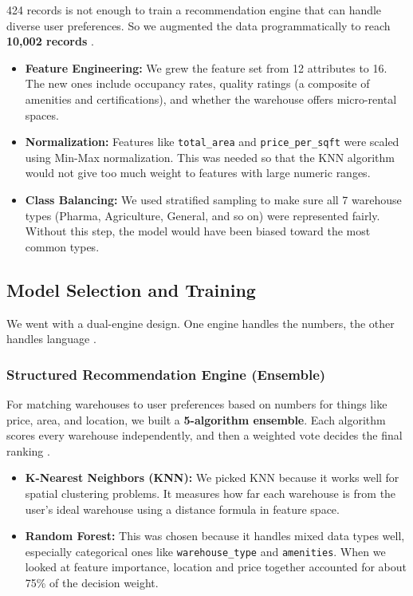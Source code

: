 \documentclass[pdflatex,sn-mathphys-num]{sn-jnl}
\theoremstyle{thmstyleone}
\theoremstyle{thmstyletwo}
\theoremstyle{thmstylethree}
\begin{document}
424 records is not enough to train a recommendation engine
that can handle diverse user preferences.
So we augmented the data programmatically to reach
\textbf{10,002 records} \cite{b10}.
\begin{itemize}
    \item \textbf{Feature Engineering:}
      We grew the feature set from 12 attributes to 16.
      The new ones include occupancy rates, quality ratings
      (a composite of amenities and certifications), and
      whether the warehouse offers micro-rental spaces.

    \item \textbf{Normalization:}
      Features like \texttt{total\_area} and
      \texttt{price\_per\_sqft} were scaled using Min-Max
      normalization.
      This was needed so that the KNN algorithm would not
      give too much weight to features with large numeric
      ranges.

    \item \textbf{Class Balancing:}
      We used stratified sampling to make sure all
      7 warehouse types (Pharma, Agriculture, General,
      and so on) were represented fairly.
      Without this step, the model would have been biased
      toward the most common types.
\end{itemize}


\subsection{Model Selection and Training}\label{subsec:model}

We went with a dual-engine design.
One engine handles the numbers, the other handles language
\cite{b3, b10}.

\subsubsection{Structured Recommendation Engine (Ensemble)}%
\label{subsubsec:ensemble}

For matching warehouses to user preferences based on numbers
for things like price, area, and location, we built a
\textbf{5-algorithm ensemble}.
Each algorithm scores every warehouse independently, and then
a weighted vote decides the final ranking \cite{b10}.
\begin{itemize}
    \item \textbf{K-Nearest Neighbors (KNN):}
      We picked KNN because it works well for spatial
      clustering problems.
      It measures how far each warehouse is from the user's
      ideal warehouse using a distance formula in feature
      space.

    \item \textbf{Random Forest:}
      This was chosen because it handles mixed data types
      well, especially categorical ones like
      \texttt{warehouse\_type} and \texttt{amenities}.
      When we looked at feature importance, location and
      price together accounted for about 75\% of the
      decision weight.
\end{itemize}
\end{document}
